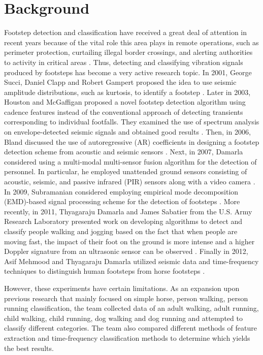 \documentclass{article}[11pt]
\begin{document}
\section{Background}
\label{sec:background}
Footstep detection and classification have received a great deal of attention in recent years because of the vital role this area plays in remote operations, such as perimeter protection, curtailing illegal border crossings, and alerting authorities to activity in critical areas \cite{Mehmood2012}. Thus, detecting and classifying vibration signals produced by footsteps has become a very active research topic. In 2001, George Succi, Daniel Clapp and Robert Gampert proposed the idea to use seismic amplitude distributions, such as kurtosis, to identify a footstep \cite{Succi2001}. Later in 2003, Houston and McGaffigan proposed a novel footstep detection algorithm using cadence features instead of the conventional approach of detecting transients corresponding to individual footfalls. They examined the use of spectrum analysis on envelope-detected seismic signals and obtained good results \cite{Houston2003}. Then, in 2006, Bland discussed the use of autoregressive (AR) coefficients in designing a footstep detection scheme from acoustic and seismic sensors \cite{Bland2006}. Next, in 2007,  Damarla considered using a multi-modal multi-sensor fusion algorithm for the detection of personnel. In particular, he employed unattended ground sensors consisting of acoustic, seismic, and passive infrared (PIR) sensors along with a video camera \cite{Damarla2007}. In 2009, Subramanian considered employing empirical mode decomposition (EMD)-based signal processing scheme for the detection of footsteps \cite{Subramanian2009}.  More recently, in 2011, Thyagaraju Damarla and James Sabatier from the U.S. Army Research Laboratory presented work on developing algorithms to detect and classify people walking and jogging based on the fact that when people are moving fast, the impact of their foot on the ground is more intense and a higher Doppler signature from an ultrasonic sensor can be observed \cite{Damarla2011}. Finally in 2012, Asif Mehmood and Thyagaraju Damarla utilized seismic data and time-frequency techniques to distinguish human footsteps from horse footsteps \cite{Mehmood2012}. 


However, these experiments have certain limitations. As an expansion upon previous research that mainly focused on simple horse, person walking, person running classification, the team collected data of an adult walking, adult running, child walking, child running, dog walking and dog running and attempted to classify different categories. The team also compared different methods of feature extraction and time-frequency classification methods to determine which yields the best results.
\end{document}
